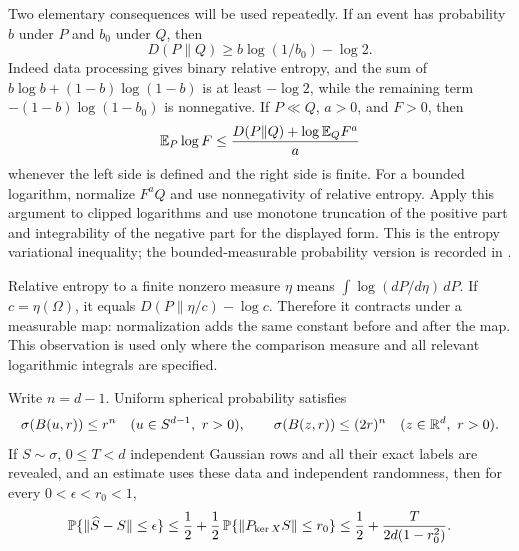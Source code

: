 Two elementary consequences will be used repeatedly. If an event has
probability \(b\) under \(P\) and \(b_0\) under \(Q\), then
\begin{equation}\label{l:binary}
 D(P\|Q)\ge b\log(1/b_0)-\log2.
\end{equation}
Indeed data processing gives binary relative entropy, and the sum of
\(b\log b+(1-b)\log(1-b)\) is at least \(-\log2\), while the
remaining term \(-(1-b)\log(1-b_0)\) is nonnegative. If \(P\ll Q\),
\(a>0\), and \(F>0\), then
\begin{equation}\label{l:tilt}
 \mathbb E_P\log F\le
 \frac{D(P\|Q)+\log\mathbb E_QF^a}{a}
\end{equation}
whenever the left side is defined and the right side is finite.
For a bounded logarithm, normalize \(F^aQ\) and use nonnegativity of
relative entropy. Apply this argument to clipped logarithms and use
monotone truncation of the positive part and integrability of the
negative part for the displayed form. This is the entropy
variational inequality; the bounded-measurable probability version
is recorded in \cite[Equations~(1.1)--(1.2)]{DupuisMao2022}.

Relative entropy to a finite nonzero measure \(\eta\) means
\(\int\log(dP/d\eta)\,dP\). If \(c=\eta(\Omega)\), it equals
\(D(P\|\eta/c)-\log c\). Therefore it contracts under a measurable
map: normalization adds the same constant before and after the map.
This observation is used only where the comparison measure and all
relevant logarithmic integrals are specified.

\begin{lemma}\label{l:caps-endpoint}
Write \(n=d-1\). Uniform spherical probability satisfies
\[
 \sigma(B(u,r))\le r^n\quad(u\in S^{d-1},\ r>0),
 \qquad
 \sigma(B(z,r))\le(2r)^n\quad(z\in\R^d,\ r>0).
\]
If \(S\sim\sigma\), \(0\le T<d\) independent Gaussian rows and all
their exact labels are revealed, and an estimate uses these data and
independent randomness, then for every \(0<\epsilon<r_0<1\),
\begin{equation}\label{l:raw-success}
 \mathbb P\{\|\widehat S-S\|\le\epsilon\}
 \le \frac12+\frac12\,
 \mathbb P\!\left\{\|P_{\ker X}S\|\le r_0\right\}
 \le \frac12+\frac{T}{2d(1-r_0^2)}.
\end{equation}
\end{lemma}

